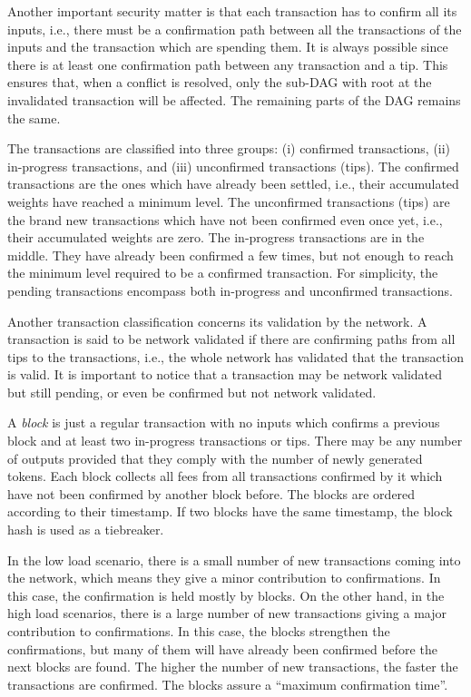 Another important security matter is that each transaction has to confirm all its inputs, i.e., there must be a confirmation path between all the transactions of the inputs and the transaction which are spending them. It is always possible since there is at least one confirmation path between any transaction and a tip. This ensures that, when a conflict is resolved, only the sub-DAG with root at the invalidated transaction will be affected. The remaining parts of the DAG remains the same.

The transactions are classified into three groups: (i) confirmed transactions, (ii) in-progress transactions, and (iii) unconfirmed transactions (tips). The confirmed transactions are the ones which have already been settled, i.e., their accumulated weights have reached a minimum level. The unconfirmed transactions (tips) are the brand new transactions which have not been confirmed even once yet, i.e., their accumulated weights are zero. The in-progress transactions are in the middle. They have already been confirmed a few times, but not enough to reach the minimum level required to be a confirmed transaction. For simplicity, the pending transactions encompass both in-progress and unconfirmed transactions.

Another transaction classification concerns its validation by the network. A transaction is said to be network validated if there are confirming paths from all tips to the transactions, i.e., the whole network has validated that the transaction is valid. It is important to notice that a transaction may be network validated but still pending, or even be confirmed but not network validated.

A \emph{block} is just a regular transaction with no inputs which confirms a previous block and at least two in-progress transactions or tips. There may be any number of outputs provided that they comply with the number of newly generated tokens. Each block collects all fees from all transactions confirmed by it which have not been confirmed by another block before. The blocks are ordered according to their timestamp. If two blocks have the same timestamp, the block hash is used as a tiebreaker.

In the low load scenario, there is a small number of new transactions coming into the network, which means they give a minor contribution to confirmations. In this case, the confirmation is held mostly by blocks. On the other hand, in the high load scenarios, there is a large number of new transactions giving a major contribution to confirmations. In this case, the blocks strengthen the confirmations, but many of them will have already been confirmed before the next blocks are found. The higher the number of new transactions, the faster the transactions are confirmed. The blocks assure a ``maximum confirmation time''.

